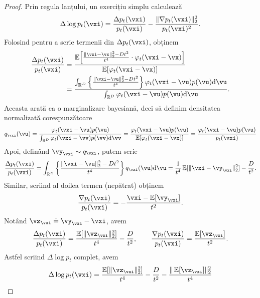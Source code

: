 \documentclass[../../book-main_ro.tex]{subfiles}
\begin{document}
\begin{proof}
    Prin regula lanțului, un exercițiu simplu calculează 
    \begin{equation}
        \Delta \log p_{t}(\vxi) = \frac{\Delta p_{t}(\vxi)}{p_{t}(\vxi)} - \frac{\norm{\nabla p_{t}(\vxi)}_{2}^{2}}{p_{t}(\vxi)^{2}}.
    \end{equation}
    Folosind  pentru a scrie termenii din \(\Delta p_{t}(\vxi)\), obținem
    \begin{align}
        \frac{\Delta p_{t}(\vxi)}{p_{t}(\vxi)}
        &= \frac{\Ex\rs{\frac{\norm{\vxi - \vx}_{2}^{2} - Dt^{2}}{t^{4}} \cdot \phi_{t}(\vxi - \vx)}}{\Ex[\phi_{t}(\vxi - \vx)]} \\
        &= \frac{\int_{\R^{D}}\bc{\frac{\norm{\vxi - \vu}_{2}^{2} - Dt^{2}}{t^{4}}}\phi_{t}(\vxi - \vu)p(\vu)\odif{\vu}}{\int_{\R^{D}}\phi_{t}(\vxi - \vu)p(\vu)\odif{\vu}}.
    \end{align}
    Aceasta arată ca o marginalizare bayesiană, deci să definim densitatea normalizată corespunzătoare
    \begin{equation}
        q_{\vxi}(\vu) = \frac{\phi_{t}(\vxi - \vu)p(\vu)}{\int_{\R^{D}}\phi_{t}(\vxi - \vv)p(\vv)\odif{\vv}} = \frac{\phi_{t}(\vxi - \vu)p(\vu)}{\Ex[\phi_{t}(\vxi - \vx)]} = \frac{\phi_{t}(\vxi - \vu)p(\vu)}{p_{t}(\vxi)}
    \end{equation}
    Apoi, definând \(\vy_{\vxi} \sim q_{\vxi}\), putem scrie 
    \begin{equation}
        \frac{\Delta p_{t}(\vxi)}{p_{t}(\vxi)} = \int_{\R^{D}}\bc{\frac{\norm{\vxi - \vu}_{2}^{2} - Dt^{2}}{t^{4}}}q_{\vxi}(\vu)\odif{\vu} = \frac{1}{t^{4}}\Ex[\norm{\vxi - \vy_{\vxi}}_{2}^{2}] - \frac{D}{t^{2}}.
    \end{equation}
    Similar, scriind al doilea termen (nepătrat) obținem
    \begin{equation}
        \frac{\nabla p_{t}(\vxi)}{p_{t}(\vxi)} = -\frac{\vxi - \Ex[\vy_{\vxi}]}{t^{2}}.
    \end{equation}
    Notând \(\vz_{\vxi} \doteq \vy_{\vxi} - \vxi\), avem
    \begin{equation}
        \frac{\Delta p_{t}(\vxi)}{p_{t}(\vxi)} = \frac{\Ex[\norm{\vz_{\vxi}}_{2}^{2}]}{t^{4}} - \frac{D}{t^{2}}, \qquad \frac{\nabla p_{t}(\vxi)}{p_{t}(\vxi)} = \frac{\Ex[\vz_{\vxi}]}{t^{2}}.
    \end{equation}
    Astfel scriind \(\Delta \log p_{t}\) complet, avem
    \begin{align}
        \Delta \log p_{t}(\vxi)
        &= \frac{\Ex[\norm{\vz_{\vxi}}_{2}^{2}]}{t^{4}} - \frac{D}{t^{2}} - \frac{\norm{\Ex[\vz_{\vxi}]}_{2}^{2}}{t^{4}} \\

\end{align}
\end{proof}
\end{document}
